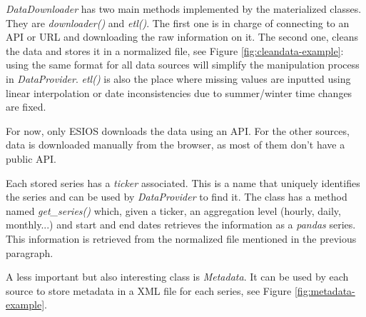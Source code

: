 \textit{DataDownloader} has two main methods implemented by the materialized classes. They are \textit{downloader()} and \textit{etl()}. The first one is in charge of connecting to an API or URL and downloading the raw information on it. The second one, cleans the data and stores it in a normalized file, see Figure \ref{fig:cleandata-example}: using the same format for all data sources will simplify the manipulation process in \textit{DataProvider}. \textit{etl()} is also the place where missing values are inputted using linear interpolation or date inconsistencies due to summer/winter time changes are fixed.

For now, only ESIOS downloads the data using an API. For the other sources, data is downloaded manually from the browser, as most of them don't have a public API.

Each stored series has a \textit{ticker} associated. This is a name that uniquely identifies the series and can be used by \textit{DataProvider} to find it. The class has a method named \textit{get\_series()} which, given a ticker, an aggregation level (hourly, daily, monthly...) and start and end dates retrieves the information as a \textit{pandas} series. This information is retrieved from the normalized file mentioned in the previous paragraph.

A less important but also interesting class is \textit{Metadata}. It can be used by each source to store metadata in a XML file for each series, see Figure \ref{fig:metadata-example}.

